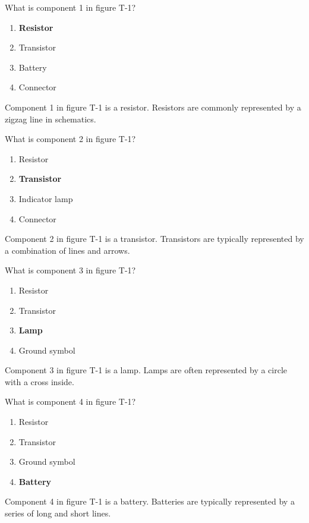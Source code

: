 \begin{tcolorbox}[colback=gray!10!white,colframe=black!75!black,title={T6C02}]
    What is component 1 in figure T-1?
    \begin{enumerate}[label=\Alph*),noitemsep]
        \item \textbf{Resistor}
        \item Transistor
        \item Battery
        \item Connector
    \end{enumerate}
\end{tcolorbox}
Component 1 in figure T-1 is a resistor. Resistors are commonly represented by a zigzag line in schematics.

\begin{tcolorbox}[colback=gray!10!white,colframe=black!75!black,title={T6C03}]
    What is component 2 in figure T-1?
    \begin{enumerate}[label=\Alph*),noitemsep]
        \item Resistor
        \item \textbf{Transistor}
        \item Indicator lamp
        \item Connector
    \end{enumerate}
\end{tcolorbox}
Component 2 in figure T-1 is a transistor. Transistors are typically represented by a combination of lines and arrows.

\begin{tcolorbox}[colback=gray!10!white,colframe=black!75!black,title={T6C04}]
    What is component 3 in figure T-1?
    \begin{enumerate}[label=\Alph*),noitemsep]
        \item Resistor
        \item Transistor
        \item \textbf{Lamp}
        \item Ground symbol
    \end{enumerate}
\end{tcolorbox}
Component 3 in figure T-1 is a lamp. Lamps are often represented by a circle with a cross inside.

\begin{tcolorbox}[colback=gray!10!white,colframe=black!75!black,title={T6C05}]
    What is component 4 in figure T-1?
    \begin{enumerate}[label=\Alph*),noitemsep]
        \item Resistor
        \item Transistor
        \item Ground symbol
        \item \textbf{Battery}
    \end{enumerate}
\end{tcolorbox}
Component 4 in figure T-1 is a battery. Batteries are typically represented by a series of long and short lines.

